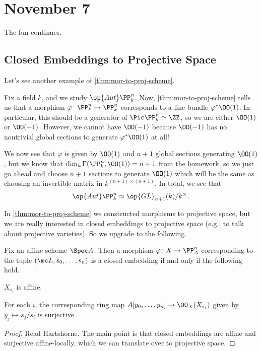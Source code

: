 \documentclass[../notes.tex]{subfiles}
\begin{document}
\section{November 7}

The fun continues.

\subsection{Closed Embeddings to Projective Space}
Let's see another example of \autoref{thm:mor-to-proj-scheme}.
\begin{example}
	Fix a field $k$, and we study $\op{Aut}\PP^n_k$. Now, \autoref{thm:mor-to-proj-scheme} tells us that a morphism $\varphi\colon\PP^n_k\to\PP^n_k$ corresponds to a line bundle $\varphi^*\OO(1)$. In particular, this should be a generator of $\Pic\PP^n_k\simeq\ZZ$, so we are either $\OO(1)$ or $\OO(-1)$. However, we cannot have $\OO(-1)$ because $\OO(-1)$ has no nontrivial global sections to generate $\varphi^*\OO(1)$ at all!
	
	We now see that $\varphi$ is given by $\OO(1)$ and $n+1$ global sections generating $\OO(1)$, but we know that $\dim_k\Gamma(\PP^n_k,\OO(1))=n+1$ from the homework, so we just go ahead and choose $n+1$ sections to generate $\OO(1)$ which will be the same as choosing an invertible matrix in $k^{(n+1)\times(n+1)}$. In total, we see that
	\[\op{Aut}\PP^n_k\simeq\op{GL}_{n+1}(k)/k^\times.\]
\end{example}
In \autoref{thm:mor-to-proj-scheme} we constructed morphisms to projective space, but we are really interested in closed embeddings to projective space (e.g., to talk about projective varieties). So we upgrade to the following.
\begin{proposition}
	Fix an affine scheme $\Spec A$. Then a morphism $\varphi\colon X\to\PP^n_A$ corresponding to the tuple $(\mc L,s_0,\ldots,s_n)$ is a closed embedding if and only if the following hold.
	\begin{listroman}
		\item $X_{s_i}$ is affine.
		\item For each $i$, the corresponding ring map $A[y_0,\ldots,y_n]\to\OO_X(X_{s_i})$ given by $y_j\mapsto s_j/s_i$ is surjective.
	\end{listroman}
\end{proposition}
\begin{proof}
	Read Hartshorne. The main point is that closed embeddings are affine and surjective affine-locally, which we can translate over to projective space.
\end{proof}
\end{document}

